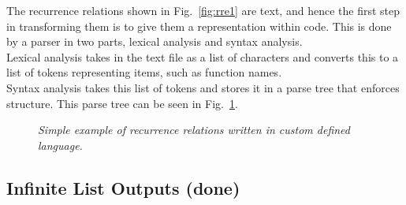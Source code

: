 \documentclass{article}
\begin{document}




The recurrence relations shown in Fig.~\ref{fig:rre1} are text, and hence the first step in transforming them is to give them a representation within code. This is done by a parser in two parts, lexical analysis and syntax analysis.\\
Lexical analysis takes in the text file as a list of characters and converts this to a list of tokens representing items, such as function names.\\
Syntax analysis takes this list of tokens and stores it in a parse tree that enforces structure. This parse tree can be seen in Fig.~\ref{fig:parsetree}.  
 
\begin{figure}[H]
	\centering
	
	\caption{\it Simple example of recurrence relations written in custom defined language.}
	\label{fig:parsetree}
\end{figure} 


\subsection{Infinite List Outputs (done)}





\end{document}
